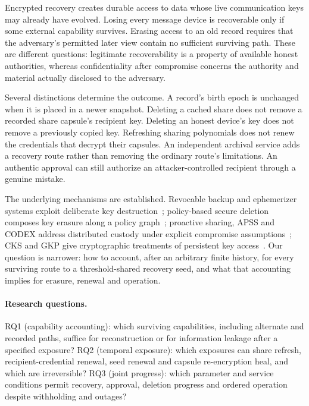 \documentclass[pdflatex,sn-mathphys-num]{sn-jnl}%
\theoremstyle{plain}
\theoremstyle{definition}
\begin{document}
Encrypted recovery creates durable access to data whose live communication keys may already have evolved. Losing every message device is recoverable only if some external capability survives. Erasing access to an old record requires that the adversary's permitted later view contain no sufficient surviving path. These are different questions: legitimate recoverability is a property of available honest authorities, whereas confidentiality after compromise concerns the authority and material actually disclosed to the adversary.

Several distinctions determine the outcome. A record's birth epoch is unchanged when it is placed in a newer snapshot. Deleting a cached share does not remove a recorded share capsule's recipient key. Deleting an honest device's key does not remove a previously copied key. Refreshing sharing polynomials does not renew the credentials that decrypt their capsules. An independent archival service adds a recovery route rather than removing the ordinary route's limitations. An authentic approval can still authorize an attacker-controlled recipient through a genuine mistake.

The underlying mechanisms are established. Revocable backup and ephemerizer systems exploit deliberate key destruction~\cite{boneh1996,perlman2007}; policy-based secure deletion composes key erasure along a policy graph~\cite{cachin2013}; proactive sharing, APSS and CODEX address distributed custody under explicit compromise assumptions~\mbox{\cite{ostrovsky1991,herzberg1995,zhou2005,marsh2004}}; CKS and GKP give cryptographic treatments of persistent key access~\cite{dodis2024,dodisstandard2024,backendal2026}. Our question is narrower: how to account, after an arbitrary finite history, for every surviving route to a threshold-shared recovery seed, and what that accounting implies for erasure, renewal and operation.

\paragraph{Research questions.}
RQ1 (capability accounting): which surviving capabilities, including alternate and recorded paths, suffice for reconstruction or for information leakage after a specified exposure? RQ2 (temporal exposure): which exposures can share refresh, recipient-credential renewal, seed renewal and capsule re-encryption heal, and which are irreversible? RQ3 (joint progress): which parameter and service conditions permit recovery, approval, deletion progress and ordered operation despite withholding and outages?
\end{document}
